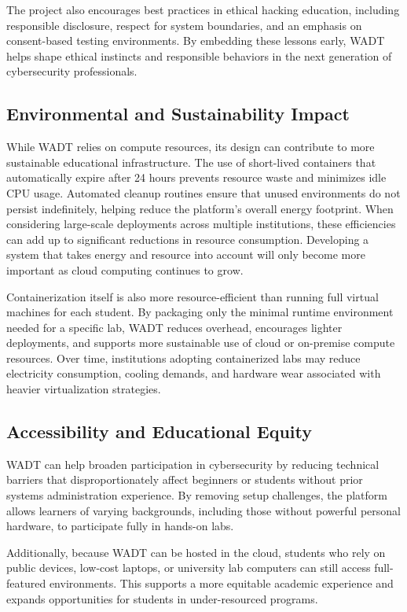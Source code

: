 \documentclass[12pt,titlepage]{article}
\begin{document}
The project also encourages best practices in ethical hacking education, including responsible disclosure, respect for system boundaries, and an emphasis on consent-based testing environments. By embedding these lessons early, WADT helps shape ethical instincts and responsible behaviors in the next generation of cybersecurity professionals.

\subsection{Environmental and Sustainability Impact}

While WADT relies on compute resources, its design can contribute to more sustainable educational infrastructure. The use of short-lived containers that automatically expire after 24 hours prevents resource waste and minimizes idle CPU usage. Automated cleanup routines ensure that unused environments do not persist indefinitely, helping reduce the platform’s overall energy footprint. When considering large-scale deployments across multiple institutions, these efficiencies can add up to significant reductions in resource consumption. Developing a system that takes energy and resource into account will only become more important as cloud computing continues to grow.

Containerization itself is also more resource-efficient than running full virtual machines for each student. By packaging only the minimal runtime environment needed for a specific lab, WADT reduces overhead, encourages lighter deployments, and supports more sustainable use of cloud or on-premise compute resources. Over time, institutions adopting containerized labs may reduce electricity consumption, cooling demands, and hardware wear associated with heavier virtualization strategies.

\subsection{Accessibility and Educational Equity}

WADT can help broaden participation in cybersecurity by reducing technical barriers that disproportionately affect beginners or students without prior systems administration experience. By removing setup challenges, the platform allows learners of varying backgrounds, including those without powerful personal hardware, to participate fully in hands-on labs.

Additionally, because WADT can be hosted in the cloud, students who rely on public devices, low-cost laptops, or university lab computers can still access full-featured environments. This supports a more equitable academic experience and expands opportunities for students in under-resourced programs.
\end{document}
